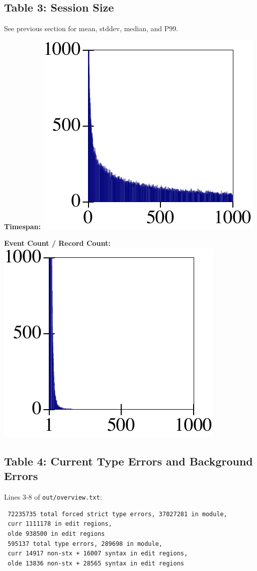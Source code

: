 \documentclass{article}
\begin{document}
\subsection*{Table 3: Session Size}

See previous section for mean, stddev, median, and P99.

\begin{minipage}{0.5\columnwidth}
  \textbf{Timespan:}
  \includegraphics[width=0.4\columnwidth]{out/timespan-distribution.pdf}
\end{minipage}\begin{minipage}{0.5\columnwidth}
  \textbf{Event Count / Record Count:}
  \includegraphics[width=0.4\columnwidth]{out/event-count-distribution.pdf}
\end{minipage}


\subsection*{Table 4: Current Type Errors and Background Errors}

Lines 3-8 of \texttt{out/overview.txt}:

\begin{verbatim}
 72235735 total forced strict type errors, 37027281 in module,
 curr 1111178 in edit regions,
 olde 938500 in edit regions
 595137 total type errors, 289698 in module,
 curr 14917 non-stx + 16007 syntax in edit regions,
 olde 13836 non-stx + 28565 syntax in edit regions
\end{verbatim}
\end{document}
